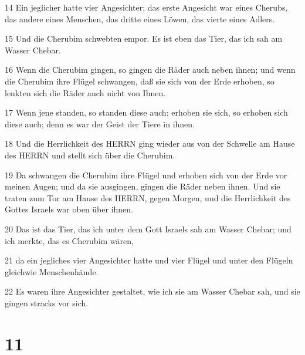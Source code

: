 \par 14 Ein jeglicher hatte vier Angesichter; das erste Angesicht war eines Cherubs, das andere eines Menschen, das dritte eines Löwen, das vierte eines Adlers.
\par 15 Und die Cherubim schwebten empor. Es ist eben das Tier, das ich sah am Wasser Chebar.
\par 16 Wenn die Cherubim gingen, so gingen die Räder auch neben ihnen; und wenn die Cherubim ihre Flügel schwangen, daß sie sich von der Erde erhoben, so lenkten sich die Räder auch nicht von Ihnen.
\par 17 Wenn jene standen, so standen diese auch; erhoben sie sich, so erhoben sich diese auch; denn es war der Geist der Tiere in ihnen.
\par 18 Und die Herrlichkeit des HERRN ging wieder aus von der Schwelle am Hause des HERRN und stellt sich über die Cherubim.
\par 19 Da schwangen die Cherubim ihre Flügel und erhoben sich von der Erde vor meinen Augen; und da sie ausgingen, gingen die Räder neben ihnen. Und sie traten zum Tor am Hause des HERRN, gegen Morgen, und die Herrlichkeit des Gottes Israels war oben über ihnen.
\par 20 Das ist das Tier, das ich unter dem Gott Israels sah am Wasser Chebar; und ich merkte, das es Cherubim wären,
\par 21 da ein jegliches vier Angesichter hatte und vier Flügel und unter den Flügeln gleichwie Menschenhände.
\par 22 Es waren ihre Angesichter gestaltet, wie ich sie am Wasser Chebar sah, und sie gingen stracks vor sich.

\chapter{11}

